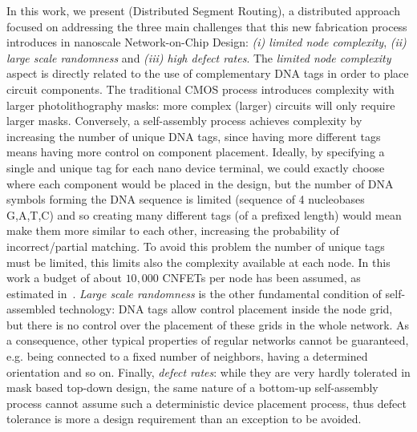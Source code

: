 In this work, we present \disr{} (Distributed Segment Routing), a distributed
approach focused on addressing the three main challenges that this new fabrication process introduces
in nanoscale Network-on-Chip Design: \emph{(i) limited node complexity}, \emph{(ii) large scale
randomness} and \emph{(iii) high defect rates}.  
The \emph{limited node complexity} aspect is directly
related to the use of complementary DNA tags in order to place circuit
components. The traditional CMOS process introduces complexity 
with larger photolithography masks: more complex (larger) circuits
will only require larger masks. Conversely, a self-assembly process achieves
complexity by increasing the number of unique DNA tags, since having more
different tags means having more control on component placement. Ideally, by specifying a single
and unique tag for each nano device terminal, we could exactly
choose where each component would be placed in the design, but the number of DNA
symbols forming the DNA sequence is limited (sequence of 4 nucleobases
G,A,T,C) and so creating many different tags (of a prefixed length) would
mean make them more similar to each other, increasing the probability
of incorrect/partial matching. To avoid this problem 
the number of unique tags must be limited, this limits also the
complexity available at each node.
In this work a budget of about $10,000$ CNFETs per node
has been assumed, as estimated in~\cite{liu_jetcs}.
\emph{Large scale randomness} is the other fundamental condition of
self-assembled technology: DNA tags allow control placement inside the
node grid, but there is no control over the placement of these grids
in the whole network. As a consequence, other typical
properties of regular networks cannot be guaranteed, e.g. being
connected to a fixed number of neighbors, having a determined
orientation and so on.
Finally, \emph{defect rates}: while they are very hardly tolerated in mask
based top-down design, the same nature of a bottom-up self-assembly
 process cannot assume such a deterministic device placement
process, thus defect tolerance is more a design requirement
than an exception to be avoided.

